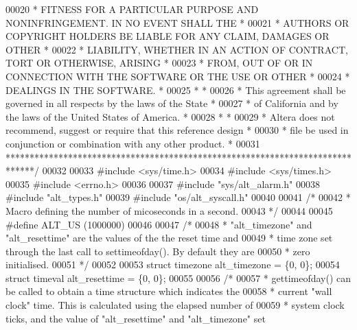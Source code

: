 \begin{DoxyCode}
00020 \textcolor{comment}{* FITNESS FOR A PARTICULAR PURPOSE AND NONINFRINGEMENT. IN NO EVENT SHALL THE *}
00021 \textcolor{comment}{* AUTHORS OR COPYRIGHT HOLDERS BE LIABLE FOR ANY CLAIM, DAMAGES OR OTHER      *}
00022 \textcolor{comment}{* LIABILITY, WHETHER IN AN ACTION OF CONTRACT, TORT OR OTHERWISE, ARISING     *}
00023 \textcolor{comment}{* FROM, OUT OF OR IN CONNECTION WITH THE SOFTWARE OR THE USE OR OTHER         *}
00024 \textcolor{comment}{* DEALINGS IN THE SOFTWARE.                                                   *}
00025 \textcolor{comment}{*                                                                             *}
00026 \textcolor{comment}{* This agreement shall be governed in all respects by the laws of the State   *}
00027 \textcolor{comment}{* of California and by the laws of the United States of America.              *}
00028 \textcolor{comment}{*                                                                             *}
00029 \textcolor{comment}{* Altera does not recommend, suggest or require that this reference design    *}
00030 \textcolor{comment}{* file be used in conjunction or combination with any other product.          *}
00031 \textcolor{comment}{******************************************************************************/}
00032 
00033 \textcolor{preprocessor}{#include <sys/time.h>}
00034 \textcolor{preprocessor}{#include <sys/times.h>}
00035 \textcolor{preprocessor}{#include <errno.h>}
00036 
00037 \textcolor{preprocessor}{#include "sys/alt_alarm.h"}
00038 \textcolor{preprocessor}{#include "alt_types.h"}
00039 \textcolor{preprocessor}{#include "os/alt_syscall.h"}
00040 
00041 \textcolor{comment}{/*}
00042 \textcolor{comment}{ * Macro defining the number of micoseconds in a second.}
00043 \textcolor{comment}{ */}
00044 
00045 \textcolor{preprocessor}{#define ALT\_US (1000000)}
00046 
00047 \textcolor{comment}{/*}
00048 \textcolor{comment}{ * "alt\_timezone" and "alt\_resettime" are the values of the the reset time and}
00049 \textcolor{comment}{ * time zone set through the last call to settimeofday(). By default they are}
00050 \textcolor{comment}{ * zero initialised.}
00051 \textcolor{comment}{ */}
00052 
00053 \textcolor{keyword}{struct }timezone alt_timezone = \{0, 0\};
00054 \textcolor{keyword}{struct }timeval  alt_resettime = \{0, 0\};
00055 
00056 \textcolor{comment}{/*}
00057 \textcolor{comment}{ * gettimeofday() can be called to obtain a time structure which indicates the}
00058 \textcolor{comment}{ * current "wall clock" time. This is calculated using the elapsed number of}
00059 \textcolor{comment}{ * system clock ticks, and the value of "alt\_resettime" and "alt\_timezone" set}

\end{DoxyCode}
